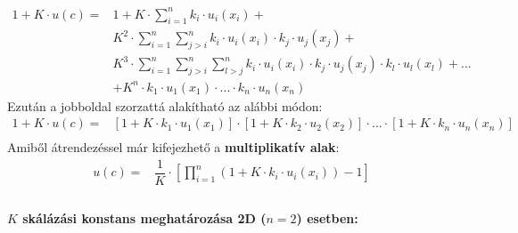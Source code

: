 \documentclass[a4paper,12pt]{article}
\begin{document}
\begin{equation}
\begin{split}
1 + K\cdot u(c) = & 1 + K\cdot \sum_{i=1}^n k_i\cdot u_i(x_i)+ \\
&K^2\cdot \sum_{i=1}^n \sum_{j>i}^n k_{i}\cdot u_i(x_i)\cdot k_{j}\cdot u_j(x_j) + \\
&K^3\cdot \sum_{i=1}^n \sum_{j>i}^n \sum_{l>j}^n k_{i}\cdot u_i(x_i)\cdot k_{j}\cdot u_j(x_j)\cdot k_{l}\cdot u_l(x_l) + ... \\ 
&+K^{n}\cdot k_{1}\cdot u_1(x_1)\cdot  ... \cdot  k_{n} \cdot  u_n(x_n)
\end{split}
\end{equation}
Ezután a jobboldal szorzattá alakítható az alábbi módon:
\begin{equation}
\begin{split}
1 + K\cdot u(c) = & [1 + K\cdot k_1\cdot u_1(x_1)] \cdot  [1 + K\cdot k_2\cdot u_2(x_2)] \cdot  ...  \cdot  [1 + K\cdot k_n\cdot u_n(x_n)]\\
\end{split}
\end{equation}
Amiből átrendezéssel már kifejezhető a \textbf{multiplikatív alak}: 
\begin{equation}
\begin{split}
u(c) = & \dfrac{1}{K} \cdot  [ \prod_{i=1}^n ( 1 + K\cdot k_i\cdot u_i(x_i)) - 1 ]\\
\end{split}
\end{equation}

\paragraph{$K$ skálázási konstans meghatározása 2D ($n=2$) esetben:} 
\end{document}
